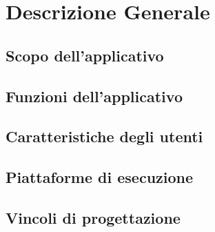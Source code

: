 \section{Descrizione Generale}
\subsection{Scopo dell'applicativo}
\subsection{Funzioni dell'applicativo}
\subsection{Caratteristiche degli utenti}
\subsection{Piattaforme di esecuzione}
\subsection{Vincoli di progettazione}